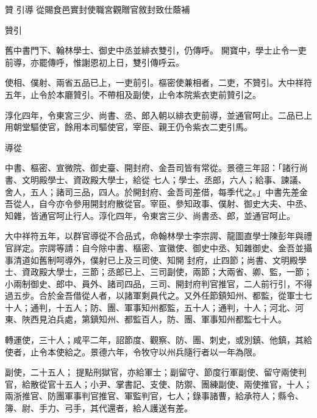 
\begin{pinyinscope}

 贊
 引導
 從賜食邑實封使職宮觀贈官敘封致仕蔭補



 贊引



 舊中書門下、翰林學士、御史中丞並緋衣雙引，仍傳呼。
 開寶中，學士止令一吏前導，亦罷傳呼，惟謝恩初上日，雙引傳呼云。



 使相、僕射、兩省五品已上，一吏前引。樞密使兼相者，二吏，不贊引。大中祥符五年，止令於本廳贊引。不帶相及副使，止令本院紫衣吏前贊引之。



 淳化四年，令東宮三少、尚書、丞、郎入朝以緋衣吏前導，並通官呵止。二品已上用朝堂驅使官，餘用本司驅使官，宰臣、親王仍令紫衣二吏引馬。



 導從



 中書、樞密、宣微院、御史臺、開封府、金吾司皆有常從。景德三年詔：「諸行尚書、文明殿學士、資政殿大學士，給從
 七人；學士、丞郎，六人；給事、諫議、舍人，五人；諸司三品，四人。於開封府、金吾司差借，每季代之。」中書先差金吾從人，自今亦令參用開封府散從官。宰臣、參知政事、僕射、御史大夫、中丞、知雜，皆通官呵止行人。淳化四年，令東宮三少、尚書丞、郎，並通官呵止。



 大中祥符五年，以群官導從不合品式，命翰林學士李宗諤、龍圖直學士陳彭年與禮官詳定。宗諤等請：自今除中書、樞密、宣徽使、御史中丞、知雜御史、金吾並攝事清道如舊制呵導外，僕射已上及三司使、知開
 封府，止四節；尚書、文明殿學士、資政殿大學士，三節；丞郎已上、三司副使，兩節；大兩省、卿、監，一節；小兩制御史、郎中、員外、諸司四品，三司、開封府判官推官，二人前行引，不得過五步。合於金吾借從人者，以諸軍剩員代之。又外任節鎮知州、都監，從軍士七十人；通判，十五人；防、團、軍事知州都監，五十人；通判，十人；河北、河東、陜西見泊兵處，第鎮知州、都監百人，防、團、軍事知州都監七十人。



 轉運使，三十人；咸平二年，詔節度、觀察、防、團、刺史，或別鎮、他鎮，其給使者，止令本使給之。景德六年，令牧守以州兵隨行者以一年為限。



 副使，二十五人；
 提點刑獄官，亦給軍士；副留守、節度行軍副使、留守兩使判官，給散從官十五人；小尹、掌書記、支使、防禦、團練副使、兩使推官，十人；兩浙推官、防團軍事判官推官、軍監判官，七人；錄事諸曹，給承符人；縣令、簿、尉、手力、弓手，其代還者，給人護送有差。




\end{pinyinscope}
